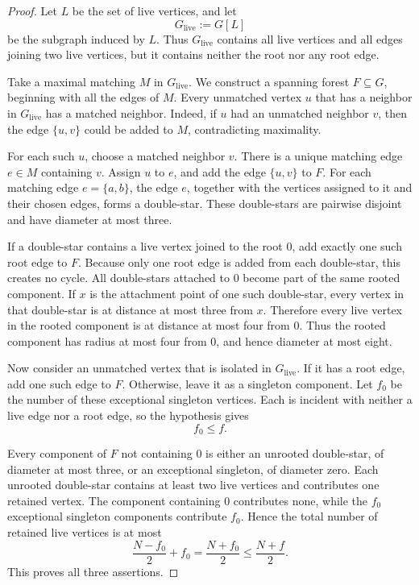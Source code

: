 \documentclass[10pt]{article}
\theoremstyle{definition}
\begin{document}
\begin{proof}
Let $L$ be the set of live vertices, and let
\[
    G_{\mathrm{live}}:=G[L]
\]
be the subgraph induced by $L$.  Thus $G_{\mathrm{live}}$ contains all live
vertices and all edges joining two live vertices, but it contains neither
the root nor any root edge.

Take a maximal matching $M$ in $G_{\mathrm{live}}$.  We construct a spanning
forest $F\subseteq G$, beginning with all the edges of $M$.  Every unmatched
vertex $u$ that has a neighbor in $G_{\mathrm{live}}$ has a matched neighbor.
Indeed, if $u$ had an unmatched neighbor $v$, then the edge $\{u,v\}$ could
be added to $M$, contradicting maximality.

For each such $u$, choose a matched neighbor $v$.  There is a unique matching
edge $e\in M$ containing $v$.  Assign $u$ to $e$, and add the edge $\{u,v\}$
to $F$.  For each matching edge $e=\{a,b\}$, the edge $e$, together with the
vertices assigned to it and their chosen edges, forms a double-star.  These
double-stars are pairwise disjoint and have diameter at most three.

If a double-star contains a live vertex joined to the root $0$, add exactly
one such root edge to $F$.  Because only one root edge is added from each
double-star, this creates no cycle.  All double-stars attached to $0$ become
part of the same rooted component.  If $x$ is the attachment point of one
such double-star, every vertex in that double-star is at distance at most
three from $x$.  Therefore every live vertex in the rooted component is at
distance at most four from $0$.  Thus the rooted component has radius at
most four from $0$, and hence diameter at most eight.

Now consider an unmatched vertex that is isolated in
$G_{\mathrm{live}}$.  If it has a root edge, add one such edge to $F$.
Otherwise, leave it as a singleton component.  Let $f_0$ be the number of
these exceptional singleton vertices.  Each is incident with neither a live
edge nor a root edge, so the hypothesis gives
\[
    f_0\le f.
\]

Every component of $F$ not containing $0$ is either an unrooted double-star,
of diameter at most three, or an exceptional singleton, of diameter zero.
Each unrooted double-star contains at least two live vertices and contributes
one retained vertex.  The component containing $0$ contributes none, while
the $f_0$ exceptional singleton components contribute $f_0$.  Hence the
total number of retained live vertices is at most
\[
    \frac{N-f_0}{2}+f_0
      =\frac{N+f_0}{2}
      \le\frac{N+f}{2}.
\]
This proves all three assertions.
\end{proof}
\end{document}
